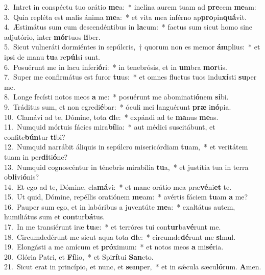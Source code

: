 {2.~}Intret in conspéctu tuo orátio \textbf{me}a:~* inclína aurem tuam ad \textbf{pre}cem \textbf{me}am:\\
{3.~}Quia repléta est malis ánima \textbf{me}a:~* et vita mea inférno ap\textbf{pro}pin\textbf{quá}vit.\\
{4.~}Æstimátus sum cum descendéntibus in \textbf{la}cum:~* factus sum sicut homo sine adjutório, inter \textbf{mór}tuos \textbf{li}ber.\\
{5.~}Sicut vulneráti dormiéntes in sepúlcris,~† quorum non es memor \textbf{ám}plius:~* et ipsi de manu \textbf{tu}a re\textbf{púl}si sunt.\\
{6.~}Posuérunt me in lacu inferi\textbf{ó}ri:~* in tenebrósis, et in \textbf{um}bra \textbf{mor}tis.\\
{7.~}Super me confirmátus est furor \textbf{tu}us:~* et omnes fluctus tuos indu\textbf{xí}sti \textbf{su}per me.\\
{8.~}Longe fecísti notos meos \textbf{a} me:~* posuérunt me abominati\textbf{ó}nem \textbf{si}bi.\\
{9.~}Tráditus sum, et non egredi\textbf{é}bar:~* óculi mei languérunt \textbf{præ} i\textbf{nó}pia.\\
{10.~}Clamávi ad te, Dómine, tota \textbf{di}e:~* expándi ad te \textbf{ma}nus \textbf{me}as.\\
{11.~}Numquid mórtuis fácies mira\textbf{bí}lia:~* aut médici suscitábunt, et confite\textbf{bún}tur \textbf{ti}bi?\\
{12.~}Numquid narrábit áliquis in sepúlcro misericórdiam \textbf{tu}am,~* et veritátem tuam in per\textbf{di}ti\textbf{ó}ne?\\
{13.~}Numquid cognoscéntur in ténebris mirabília \textbf{tu}a,~* et justítia tua in terra o\textbf{bli}vi\textbf{ó}nis?\\
{14.~}Et ego ad te, Dómine, cla\textbf{má}vi:~* et mane orátio mea præ\textbf{vé}ni\textbf{et} te.\\
{15.~}Ut quid, Dómine, repéllis oratiónem \textbf{me}am:~* avértis fáciem \textbf{tu}am \textbf{a} me?\\
{16.~}Pauper sum ego, et in labóribus a juventúte \textbf{me}a:~* exaltátus autem, humiliátus sum et \textbf{con}tur\textbf{bá}tus.\\
{17.~}In me transiérunt iræ \textbf{tu}æ:~* et terróres tui con\textbf{tur}ba\textbf{vé}runt me.\\
{18.~}Circumdedérunt me sicut aqua tota \textbf{di}e:~* circumde\textbf{dé}runt me \textbf{si}mul.\\
{19.~}Elongásti a me amícum et \textbf{pró}ximum:~* et notos meos \textbf{a} mi\textbf{sé}ria.\\
{20.~}Glória Patri, et \textbf{Fí}lio,~* et Spi\textbf{rí}tui \textbf{San}cto.\\
{21.~}Sicut erat in princípio, et nunc, et \textbf{sem}per,~* et in sǽcula sæcu\textbf{ló}rum. \textbf{A}men.\\
